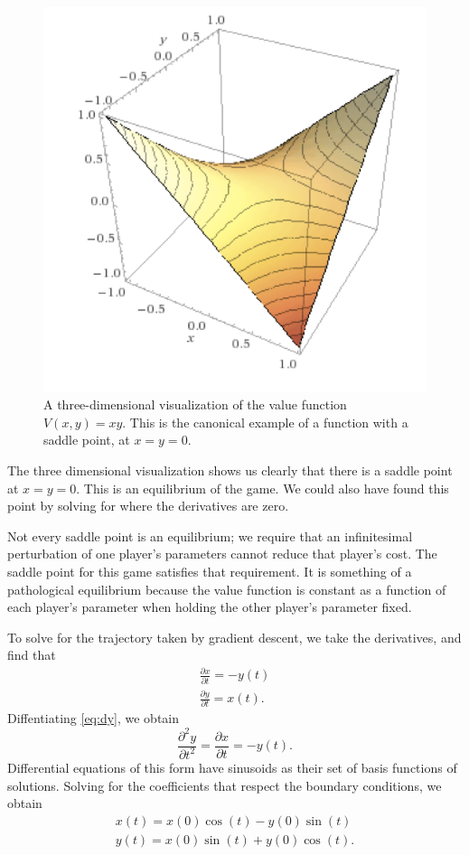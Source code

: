 \begin{figure}
\centering
\includegraphics[width=\figwidth]{xy}
\caption{A three-dimensional visualization of the value function $V(x,y) = xy$.
  This is the canonical example of a function with a saddle point, at $x=y=0$.
}
\label{fig:xy}
\end{figure}

The three dimensional visualization shows us clearly that there is a saddle point
at $x=y=0$. This is an equilibrium of the game. We could also have found this point
by solving for where the derivatives are zero.

Not every saddle point is an equilibrium; we require that an infinitesimal perturbation
of one player's parameters cannot reduce that player's cost.
The saddle point for this game satisfies that requirement.
It is something of a pathological equilibrium because the value function is constant
as a function of each player's parameter when holding the other player's parameter
fixed.

To solve for the trajectory taken by gradient descent, we take the derivatives, and find that
\begin{align}
  \frac{\partial x}{\partial t} = - y(t) \\
  \frac{\partial y}{\partial t} = x(t). \label{eq:dy}
\end{align}
Diffentiating \eqref{eq:dy}, we obtain
\[
  \frac{\partial^2 y}{\partial t^2} = \frac{\partial x}{\partial t} = -y(t).
\]
Differential equations of this form have sinusoids as their set of basis functions
of solutions.
Solving for the coefficients that respect the boundary conditions, we obtain
\begin{align}
  x(t) = x(0) \cos(t) - y(0) \sin(t) \\
  y(t) = x(0) \sin(t) + y(0) \cos(t).
\end{align}

